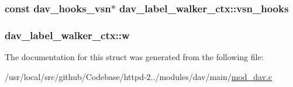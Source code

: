 \subsubsection[{\texorpdfstring{vsn\+\_\+hooks}{vsn_hooks}}]{\setlength{\rightskip}{0pt plus 5cm}const {\bf dav\+\_\+hooks\+\_\+vsn}$\ast$ dav\+\_\+label\+\_\+walker\+\_\+ctx\+::vsn\+\_\+hooks}\hypertarget{structdav__label__walker__ctx_a8bc4f91d58592ba54acfb1ab64e9d5c2}{}\label{structdav__label__walker__ctx_a8bc4f91d58592ba54acfb1ab64e9d5c2}
\subsubsection[{\texorpdfstring{w}{w}}]{ dav\+\_\+label\+\_\+walker\+\_\+ctx\+::w}\hypertarget{structdav__label__walker__ctx_ad51a8378c1a9265ae4d915656660c93a}{}\label{structdav__label__walker__ctx_ad51a8378c1a9265ae4d915656660c93a}


The documentation for this struct was generated from the following file\+:\begin{DoxyCompactItemize}
\item 
/usr/local/src/github/\+Codebase/httpd-\/2../modules/dav/main/\hyperlink{mod__dav_8c}{mod\+\_\+dav.\+c}\end{DoxyCompactItemize}
